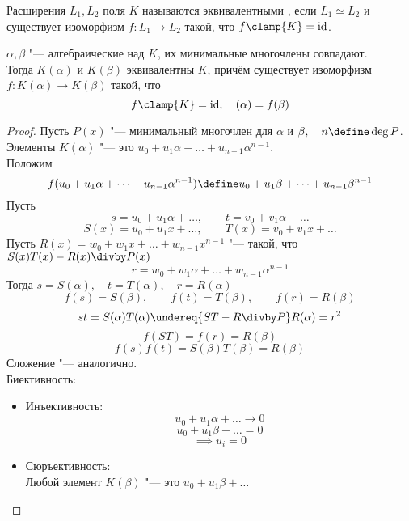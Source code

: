 \begin{definition}
	Расширения $ L_1, L_2 $ поля $ K $ называются эквивалентными \nimp[(относительно $ K $)], если $ L_1 \simeq L_2 $ и существует изоморфизм $ f : L_1 \to L_2 $ такой, что $ f\clamp{K} = \operatorname{id} $.
\end{definition}

\begin{theorem}
	$ \alpha, \beta $ "--- алгебраические над $ K $, их минимальные многочлены совпадают. \\
	Тогда $ K(\alpha) $ и $ K(\beta) $ эквивалентны $ K $, причём существует изоморфизм $ f : K(\alpha) \to K(\beta) $ такой, что
	$$ f\clamp{K} = \operatorname{id}, \quad (\alpha) = f(\beta) $$
\end{theorem}

\begin{proof}
	Пусть $ P(x) $ "--- минимальный многочлен для $ \alpha $ и $ \beta, \quad n \define \deg P $. \\
	Элементы $ K(\alpha) $ "--- это $ u_0 + u_1\alpha + \dots + u_{n - 1}\alpha^{n - 1} $. \\
	Положим
	$$ f(u_0 + u_1 \alpha + \dots + u_{n - 1}\alpha^{n - 1}) \define u_0 + u_1\beta + \dots + u_{n - 1}\beta^{n - 1} $$
	Пусть
	$$ s = u_0 + u_1\alpha + \dots, \qquad t = v_0 + v_1\alpha + \dots $$
	$$ S(x) = u_0 + u_1 x + \dots, \qquad T(x) = v_0 + v_1x + \dots $$
	Пусть $ R(x) = w_0 + w_1x + \dots + w_{n - 1}x^{n - 1} $ "--- такой, что $ S(x)T(x) - R(x) \divby P(x) $
	$$ r = w_0 + w_1\alpha + \dots + w_{n - 1}\alpha^{n - 1} $$
	Тогда $ s = S(\alpha), \quad t = T(\alpha), \quad r = R(\alpha) $
	$$ f(s) = S(\beta), \qquad f(t) = T(\beta), \qquad f(r) = R(\beta) $$
	$$ st = S(\alpha) T(\alpha) \undereq{ST - R \divby P} R(\alpha) = r^2 $$
	$$ f(ST) = f(r) = R(\beta) $$
	$$ f(s)f(t) = S(\beta)T(\beta) = R(\beta) $$
	Сложение "--- аналогично. \\
	Биективность:
	\begin{itemize}
		\item Инъективность:
		$$ u_0 + u_1\alpha + \dots \to 0 $$
		$$ u_0 + u_1\beta + \dots = 0 $$
		$$ \implies u_i = 0 $$
		\item Сюръективность: \\
		Любой элемент $ K(\beta) $ "--- это $ u_0 + u_1\beta + \dots $
	\end{itemize}
\end{proof}

